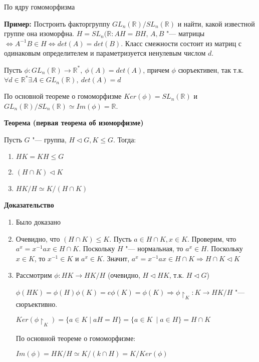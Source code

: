 \documentclass{article}
\begin{document}
По ядру гомоморфизма

\vspace{10pt}

\textbf{Пример:}
Построить факторгруппу $GL_n(\mathbb{R})/SL_n(\mathbb{R})$ и найти, какой известной группе она изоморфна. $H = SL_n(\mathbb{R}: AH = BH$, $A,B$ "--- матрицы $\Leftrightarrow A^{-1}B \in H \Leftrightarrow det(A) = det(B)$. Класс смежности состоит из матриц с одинаковым определителем и параметризуется ненулевым числом $d$.

Пусть $\phi: GL_n(\mathbb{R}) \rightarrow \mathbb{R}^*, \  \phi(A) = det(A)$, причем $\phi$ сюръективен, так т.к. $\forall d \in \mathbb{R}^* \exists A \in GL_n(\mathbb{R}), \  det(A) = d$

По основной теореме о гомоморфизме $Ker(\phi) = SL_n(\mathbb{R})$ и $GL_n(\mathbb{R})/SL_n(\mathbb{R}) \simeq Im(\phi) = \mathbb{R}$.

\vspace{10pt}

\textbf{Теорема (первая теорема об изоморфизме)}

Пусть $G$ "--- группа, $H \triangleleft G, K \leq G$. Тогда:

\begin{enumerate}
	\item $HK = KH \leq G$
	\item $(H \cap K) \triangleleft K$
	\item $HK/H \simeq K/(H \cap K)$
\end{enumerate} 

\vspace{5pt}

\textbf{Доказательство}

\begin{enumerate}
	\item Было доказано
	\item Очевидно, что $(H \cap K) \leq K$. Пусть $a \in H \cap K, x \in K$. Проверим, что $a^x = x^{-1}ax \in H \cap K$. Поскольку $H$ "--- нормальная, то $a^x \in H$. Поскольку $x \in K$, то $x^{-1} \in K$ и $a^x \in K$. Значит, $a^x = x^{-1}ax \in H \cap K \Rightarrow H \cap K \triangleleft K$ 
	\item Рассмотрим $\phi: HK \rightarrow HK/H$ (очевидно, $H \triangleleft HK$, т.к. $H \triangleleft G$)
	
	$\phi(HK) = \phi(H)\phi(K) = e\phi(K) = \phi(K) \Rightarrow \phi\!\restriction_K : K \rightarrow HK/H$ "--- сюръективно.
	
	$Ker(\phi\!\restriction_K) = \{ a \in K \mid aH = H\} = \{a \in K\ \mid a \in H\} = H \cap K$
	
	По основной теореме о гомоморфизме:
	
	$Im(\phi) = HK/H \simeq K/(k \cap H) = K/Ker(\phi)$
\end{enumerate} 
\end{document}

